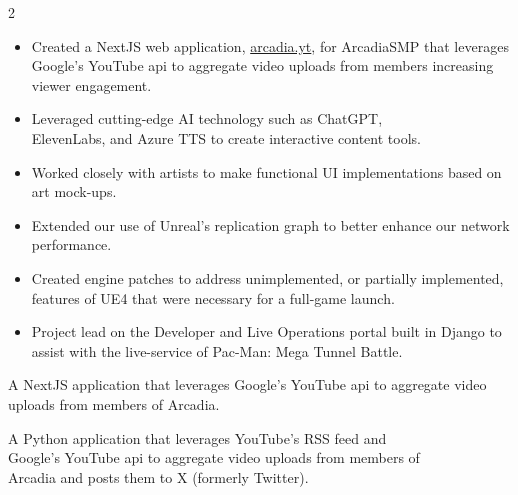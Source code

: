 \documentclass[10pt,a4paper,ragged2e,withhyper]{altacv}
\begin{document}
\begin{paracol}{2}

\begin{itemize}
  \item Created a NextJS web application, \href{https://arcadia.yt}{arcadia.yt}, for ArcadiaSMP that leverages Google's YouTube api to aggregate video uploads from members increasing viewer engagement.
  \item Leveraged cutting-edge AI technology such as ChatGPT,\\
  ElevenLabs, and Azure TTS to create interactive content tools.
\end{itemize}

\divider

\begin{itemize}
  \item Worked closely with artists to make functional UI implementations based on art mock-ups.
  \item Extended our use of Unreal's replication graph to better enhance our network performance.
  \item Created engine patches to address unimplemented, or partially implemented, features of UE4 that were necessary for a full-game launch.
  \item Project lead on the Developer and Live Operations portal built in Django to assist with the live-service of Pac-Man: Mega Tunnel Battle.
\end{itemize}


A NextJS application that leverages Google's YouTube api to aggregate video uploads from members of Arcadia.

\divider

A Python application that leverages YouTube's RSS feed and\\
Google's YouTube api to aggregate video uploads from members of\\
Arcadia and posts them to X (formerly Twitter).


\end{paracol}
\end{document}
